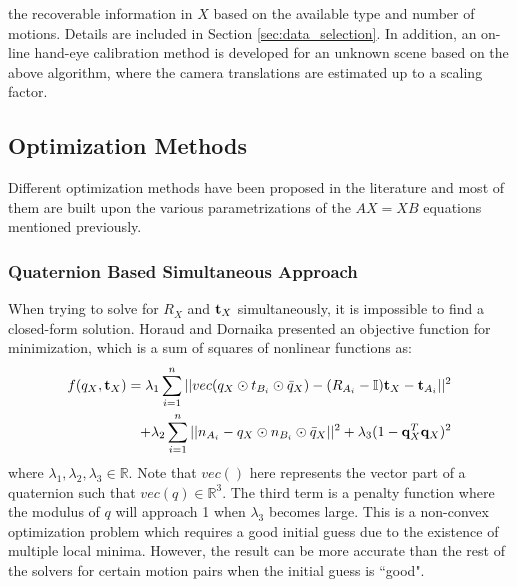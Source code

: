 \documentclass[twocolumn,10pt]{asme2ej}
\newcommand{\ttt}{{\bf t}}
\newcommand{\qq}{{\bf q}}
\begin{document}
 the  recoverable information in $X$ based on the available type and number of motions. Details are included in Section \ref{sec:data_selection}. In addition, an on-line hand-eye calibration method is developed for an unknown scene based on the above algorithm, where the camera translations are estimated up to a scaling factor. 

\subsection{Optimization Methods}
\label{sec:optimization}
Different optimization methods have been proposed in the literature and most of them are built upon the various parametrizations of the $AX=XB$ equations mentioned previously. 
\subsubsection{Quaternion Based Simultaneous Approach}
When trying to solve for $R_{X}$ and $\ttt_{X}$ simultaneously, it is impossible to find a closed-form solution. Horaud and Dornaika \cite{horaud1995hand} presented an objective function for minimization, which is a sum of squares of nonlinear functions as:
\begin{equation}
\begin{split}
f(q_X,\ttt_{X}) = \lambda_{1} \sum_{i = 1}^{n}||vec(q_{X} \odot t_{B_{i}} \odot \bar{q}_{X}) -(R_{A_i} - \mathbb{I})\ttt_{X} - \ttt_{A_i}||^{2}\\
+ \lambda_{2} \sum_{i = 1}^{n}||{n_{A_{i}} - q_{X} \odot n_{B_{i}} \odot \bar{q}_{X}}||^{2} + \lambda_{3}(1 - \qq_{X}^{T}\qq_{X})^2
\end{split}
\label{simlqua}
\end{equation}
where $\lambda_1, \lambda_2, \lambda_3 \in \mathbb{R}$. Note that $vec()$ here represents the vector part of a quaternion such that $vec(q) \in \mathbb{R}^{3}$. The third term is a penalty function where the modulus %
of $q$ will approach 1 when $\lambda_{3}$ becomes large. This is a non-convex optimization problem which requires a good initial guess due to the existence of multiple local minima. However, the result can be more accurate than the rest of the solvers for certain motion pairs when the initial guess is ``good".
\end{document}
